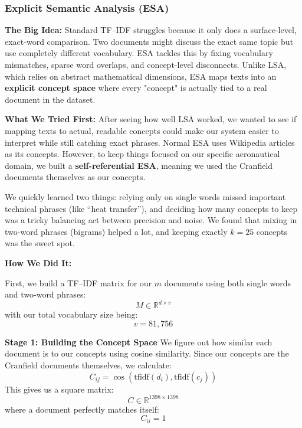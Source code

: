 \documentclass[runningheads]{llncs}
\begin{document}
\subsubsection{Explicit Semantic Analysis (ESA)}

\textbf{The Big Idea:}
Standard TF--IDF struggles because it only does a surface-level, exact-word comparison. Two documents might discuss the exact same topic but use completely different vocabulary. ESA tackles this by fixing vocabulary mismatches, sparse word overlaps, and concept-level disconnects. Unlike LSA, which relies on abstract mathematical dimensions, ESA maps texts into an \textbf{explicit concept space} where every "concept" is actually tied to a real document in the dataset.

\textbf{What We Tried First:}
After seeing how well LSA worked, we wanted to see if mapping texts to actual, readable concepts could make our system easier to interpret while still catching exact phrases. Normal ESA uses Wikipedia articles as its concepts. However, to keep things focused on our specific aeronautical domain, we built a \textbf{self-referential ESA}, meaning we used the Cranfield documents themselves as our concepts. 

We quickly learned two things: relying only on single words missed important technical phrases (like ``heat transfer''), and deciding how many concepts to keep was a tricky balancing act between precision and noise. We found that mixing in two-word phrases (bigrams) helped a lot, and keeping exactly $k = 25$ concepts was the sweet spot.

\textbf{How We Did It:}

First, we build a TF--IDF matrix for our $m$ documents using both single words and two-word phrases:
\begin{equation}
M \in \mathbb{R}^{d \times v}
\end{equation}
with our total vocabulary size being:
\begin{equation}
v = 81{,}756
\end{equation}

\noindent\textbf{Stage 1: Building the Concept Space}
We figure out how similar each document is to our concepts using cosine similarity. Since our concepts are the Cranfield documents themselves, we calculate:
\begin{equation}
C_{ij}
=
\cos\left(
\text{tfidf}(d_i),
\text{tfidf}(c_j)
\right)
\end{equation}
This gives us a square matrix:
\begin{equation}
C \in \mathbb{R}^{1398 \times 1398}
\end{equation}
where a document perfectly matches itself:
\begin{equation}
C_{ii} = 1
\end{equation}
\end{document}
